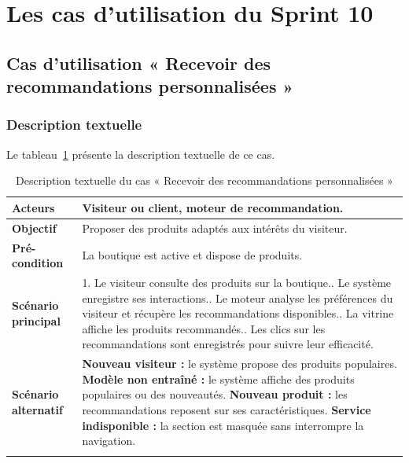\section{Les cas d'utilisation du Sprint 10}
\subsection{Cas d'utilisation « Recevoir des recommandations personnalisées »}
\subsubsection{Description textuelle}

Le tableau~\ref{tab:uc-reco} présente la description textuelle de ce cas.

\renewcommand{\arraystretch}{1.4}
\begin{longtable}{|p{4cm}|p{11cm}|}
\hline
\textbf{Acteurs} & Visiteur ou client, moteur de recommandation. \\
\hline
\textbf{Objectif} & Proposer des produits adaptés aux intérêts du visiteur. \\
\hline
\textbf{Pré-condition} & La boutique est active et dispose de produits. \\
\hline
\textbf{Scénario principal} &
1. Le visiteur consulte des produits sur la boutique.\newline
2. Le système enregistre ses interactions.\newline
3. Le moteur analyse les préférences du visiteur et récupère les recommandations disponibles.\newline
4. La vitrine affiche les produits recommandés.\newline
5. Les clics sur les recommandations sont enregistrés pour suivre leur efficacité. \\
\hline
\textbf{Scénario alternatif} &
\textbf{Nouveau visiteur :} le système propose des produits populaires.\newline
\textbf{Modèle non entraîné :} le système affiche des produits populaires ou des nouveautés.\newline
\textbf{Nouveau produit :} les recommandations reposent sur ses caractéristiques.\newline
\textbf{Service indisponible :} la section est masquée sans interrompre la navigation. \\
\hline
\caption{Description textuelle du cas « Recevoir des recommandations personnalisées »}
\label{tab:uc-reco}
\end{longtable}




